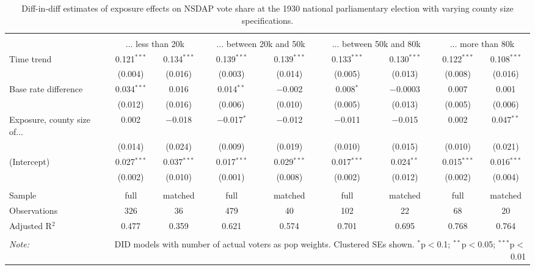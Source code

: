 
\begin{table}[!htbp] \centering 
  \caption{Diff-in-diff estimates of exposure effects on NSDAP vote share at the 1930 national parliamentary election with varying county size specifications.\vspace{-.25cm}} 
  \label{tab:nsdap-voteshare-countysize-dd-1930} 
\scriptsize 
\begin{tabular}{@{\extracolsep{5pt}}lcccccccc} 
\\[-1.8ex]\hline 
\hline \\[-1.8ex] 
 & \multicolumn{2}{c}{... less than 20k } & \multicolumn{2}{c}{... between 20k and 50k} & \multicolumn{2}{c}{... between 50k and 80k} & \multicolumn{2}{c}{... more than 80k} \\ 
 \cmidrule(r){2-3}\cmidrule(r){4-5}\cmidrule(r){6-7}\cmidrule(r){8-9}Time trend & 0.121$^{***}$ & 0.134$^{***}$ & 0.139$^{***}$ & 0.139$^{***}$ & 0.133$^{***}$ & 0.130$^{***}$ & 0.122$^{***}$ & 0.108$^{***}$ \\ 
  & (0.004) & (0.016) & (0.003) & (0.014) & (0.005) & (0.013) & (0.008) & (0.016) \\ 
  Base rate difference & 0.034$^{***}$ & 0.016 & 0.014$^{**}$ & $-$0.002 & 0.008$^{*}$ & $-$0.0003 & 0.007 & 0.001 \\ 
  & (0.012) & (0.016) & (0.006) & (0.010) & (0.005) & (0.013) & (0.005) & (0.006) \\ 
  Exposure, county size of... & 0.002 & $-$0.018 & $-$0.017$^{*}$ & $-$0.012 & $-$0.011 & $-$0.015 & 0.002 & 0.047$^{**}$ \\ 
  & (0.014) & (0.024) & (0.009) & (0.019) & (0.010) & (0.015) & (0.010) & (0.021) \\ 
  (Intercept) & 0.027$^{***}$ & 0.037$^{***}$ & 0.017$^{***}$ & 0.029$^{***}$ & 0.017$^{***}$ & 0.024$^{**}$ & 0.015$^{***}$ & 0.016$^{***}$ \\ 
  & (0.002) & (0.010) & (0.001) & (0.008) & (0.002) & (0.012) & (0.002) & (0.004) \\ 
 \hline \\[-1.8ex] 
Sample & full & matched & full & matched & full & matched & full & matched \\ 
Observations & 326 & 36 & 479 & 40 & 102 & 22 & 68 & 20 \\ 
Adjusted R$^{2}$ & 0.477 & 0.359 & 0.621 & 0.574 & 0.701 & 0.695 & 0.768 & 0.764 \\ 
\hline 
\hline \\[-1.8ex] 
\textit{Note:}  & \multicolumn{8}{r}{DID models with number of actual voters as pop weights. Clustered SEs shown. $^{*}$p$<$0.1; $^{**}$p$<$0.05; $^{***}$p$<$0.01} \\ 
\end{tabular} 
\end{table} 
